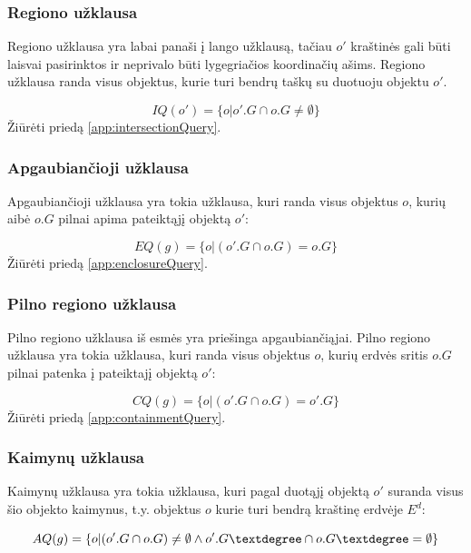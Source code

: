\subsubsection{Regiono užklausa}
Regiono užklausa yra labai panaši į lango užklausą, tačiau $o'$ kraštinės gali būti laisvai pasirinktos ir neprivalo būti lygegriačios koordinačių ašims.
Regiono užklausa randa visus objektus, kurie turi bendrų taškų su duotuoju objektu $o'$.

\begin{equation}
	IQ(o') = \{ o | o'.G \cap o.G \neq \emptyset \}
\label{eq:ExactMatchQuery}
\end{equation}
Žiūrėti priedą \ref{app:intersectionQuery}.

\subsubsection{Apgaubiančioji užklausa}
Apgaubiančioji užklausa yra tokia užklausa, kuri randa visus objektus $o$, kurių aibė $o.G$ pilnai apima pateiktąjį objektą $o'$:

\begin{equation}
	EQ(g) = \{ o | (o'.G \cap o.G) = o.G \}
\label{eq:ExactMatchQuery}
\end{equation}
Žiūrėti priedą \ref{app:enclosureQuery}.


\subsubsection{Pilno regiono užklausa}
Pilno regiono užklausa iš esmės yra priešinga apgaubiančiąjai.
Pilno regiono užklausa yra tokia užklausa, kuri randa visus objektus $o$, kurių erdvės sritis $o.G$ pilnai patenka į pateiktajį objektą $o'$:

\begin{equation}
	CQ(g) = \{ o | (o'.G \cap o.G) = o'.G \}
\label{eq:ExactMatchQuery}
\end{equation}
Žiūrėti priedą \ref{app:containmentQuery}.


\subsubsection{Kaimynų užklausa}
Kaimynų užklausa yra tokia užklausa, kuri pagal duotąjį objektą $o'$ suranda visus šio objekto kaimynus, t.y. objektus $o$ kurie turi bendrą kraštinę erdvėje $E^d$:

\begin{equation}
	AQ(g) = \{ o | (o'.G \cap o.G) \neq \emptyset \land o'.G\textdegree \cap o.G\textdegree = \emptyset \}
\label{eq:ExactMatchQuery}
\end{equation}

